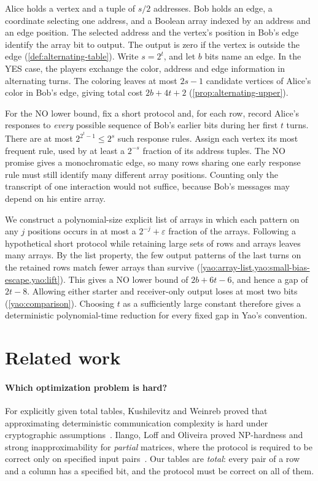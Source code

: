 \documentclass[11pt,letterpaper]{article} \usepackage[utf8]{inputenc}
\theoremstyle{plain} \newtheorem{theorem}{Theorem}[section]
\theoremstyle{definition} \newaliascnt{definition}{theorem}
\begin{document}
Alice holds a vertex and a tuple of $s/2$ addresses. Bob holds an edge,
a coordinate selecting one address, and a Boolean array indexed by an
address and an edge position. The selected
address and the vertex's position in Bob's edge identify the array bit
to output. The output is zero if the vertex is outside the edge
(\cref{def:alternating-table}).
Write $s=2^t$, and let $b$ bits name an edge. In the YES case,
the players exchange the color, address and edge information in
alternating turns. The coloring leaves at most $2s-1$ candidate
vertices of Alice's color in Bob's edge, giving total cost
$2b+4t+2$ (\cref{prop:alternating-upper}).

For the NO lower bound, fix a short protocol and, for each row, record
Alice's responses to \emph{every}
possible sequence of Bob's earlier bits during her first $t$ turns.
There are at most $2^{2^t-1}\le2^s$ such response rules. Assign each
vertex its most frequent rule, used by at least a $2^{-s}$ fraction of its
address tuples. The NO promise gives
a monochromatic edge, so many rows sharing one early response rule
must still identify many different array positions. Counting only the
transcript of one interaction would not suffice, because Bob's
messages may depend on his entire array.

We construct a polynomial-size explicit list of arrays in which each
pattern on any $j$ positions occurs in at most a $2^{-j}+\varepsilon$
fraction of the arrays. Following a
hypothetical short protocol while retaining large sets of rows and
arrays leaves many arrays. By the list property, the few output patterns
of the last turns on the retained rows match fewer arrays than survive
(\cref{yao:array-list,yao:small-bias-escape,yao:lift}).
This gives a NO lower bound of $2b+6t-6$, and hence a gap of $2t-8$.
Allowing either starter and receiver-only output loses at most two
bits (\cref{yao:comparison}). Choosing $t$ as a sufficiently large
constant therefore gives a deterministic polynomial-time reduction
for every fixed gap in Yao's convention.

\section{Related work}

\paragraph{Which optimization problem is hard?}
For explicitly given total tables, Kushilevitz and Weinreb proved that
approximating deterministic communication complexity is hard under
cryptographic assumptions~\cite{kushilevitz2009complexity}.
Ilango, Loff and Oliveira proved NP-hardness and strong
inapproximability for \emph{partial} matrices, where the protocol is
required to be correct only on specified input
pairs~\cite{ilango2020multioutput}. Our tables are \emph{total}: every
pair of a row and a column has a specified bit, and the protocol must
be correct on all of them.
\end{document}
